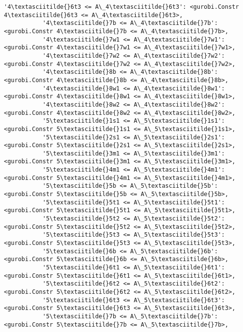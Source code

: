 \documentclass[11pt]{article}
\begin{document}
\begin{Verbatim}[commandchars=\\\{\}]
           '4\textasciitilde{}6t3 <= A\_4\textasciitilde{}6t3': <gurobi.Constr 4\textasciitilde{}6t3 <= A\_4\textasciitilde{}6t3>,
           '4\textasciitilde{}7b <= A\_4\textasciitilde{}7b': <gurobi.Constr 4\textasciitilde{}7b <= A\_4\textasciitilde{}7b>,
           '4\textasciitilde{}7w1 <= A\_4\textasciitilde{}7w1': <gurobi.Constr 4\textasciitilde{}7w1 <= A\_4\textasciitilde{}7w1>,
           '4\textasciitilde{}7w2 <= A\_4\textasciitilde{}7w2': <gurobi.Constr 4\textasciitilde{}7w2 <= A\_4\textasciitilde{}7w2>,
           '4\textasciitilde{}8b <= A\_4\textasciitilde{}8b': <gurobi.Constr 4\textasciitilde{}8b <= A\_4\textasciitilde{}8b>,
           '4\textasciitilde{}8w1 <= A\_4\textasciitilde{}8w1': <gurobi.Constr 4\textasciitilde{}8w1 <= A\_4\textasciitilde{}8w1>,
           '4\textasciitilde{}8w2 <= A\_4\textasciitilde{}8w2': <gurobi.Constr 4\textasciitilde{}8w2 <= A\_4\textasciitilde{}8w2>,
           '5\textasciitilde{}1s1 <= A\_5\textasciitilde{}1s1': <gurobi.Constr 5\textasciitilde{}1s1 <= A\_5\textasciitilde{}1s1>,
           '5\textasciitilde{}2s1 <= A\_5\textasciitilde{}2s1': <gurobi.Constr 5\textasciitilde{}2s1 <= A\_5\textasciitilde{}2s1>,
           '5\textasciitilde{}3m1 <= A\_5\textasciitilde{}3m1': <gurobi.Constr 5\textasciitilde{}3m1 <= A\_5\textasciitilde{}3m1>,
           '5\textasciitilde{}4m1 <= A\_5\textasciitilde{}4m1': <gurobi.Constr 5\textasciitilde{}4m1 <= A\_5\textasciitilde{}4m1>,
           '5\textasciitilde{}5b <= A\_5\textasciitilde{}5b': <gurobi.Constr 5\textasciitilde{}5b <= A\_5\textasciitilde{}5b>,
           '5\textasciitilde{}5t1 <= A\_5\textasciitilde{}5t1': <gurobi.Constr 5\textasciitilde{}5t1 <= A\_5\textasciitilde{}5t1>,
           '5\textasciitilde{}5t2 <= A\_5\textasciitilde{}5t2': <gurobi.Constr 5\textasciitilde{}5t2 <= A\_5\textasciitilde{}5t2>,
           '5\textasciitilde{}5t3 <= A\_5\textasciitilde{}5t3': <gurobi.Constr 5\textasciitilde{}5t3 <= A\_5\textasciitilde{}5t3>,
           '5\textasciitilde{}6b <= A\_5\textasciitilde{}6b': <gurobi.Constr 5\textasciitilde{}6b <= A\_5\textasciitilde{}6b>,
           '5\textasciitilde{}6t1 <= A\_5\textasciitilde{}6t1': <gurobi.Constr 5\textasciitilde{}6t1 <= A\_5\textasciitilde{}6t1>,
           '5\textasciitilde{}6t2 <= A\_5\textasciitilde{}6t2': <gurobi.Constr 5\textasciitilde{}6t2 <= A\_5\textasciitilde{}6t2>,
           '5\textasciitilde{}6t3 <= A\_5\textasciitilde{}6t3': <gurobi.Constr 5\textasciitilde{}6t3 <= A\_5\textasciitilde{}6t3>,
           '5\textasciitilde{}7b <= A\_5\textasciitilde{}7b': <gurobi.Constr 5\textasciitilde{}7b <= A\_5\textasciitilde{}7b>,

\end{Verbatim}
\end{document}

